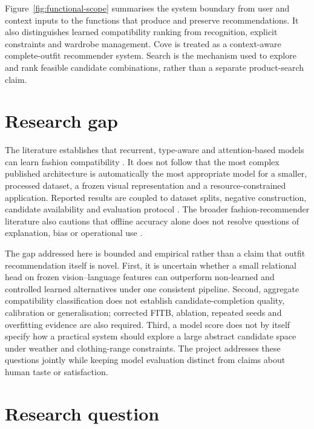 Figure~\ref{fig:functional-scope} summarises the system boundary from user and
context inputs to the functions that produce and preserve recommendations. It
also distinguishes learned compatibility ranking from recognition, explicit
constraints and wardrobe management. Cove is treated as a
context-aware complete-outfit recommender system. Search is the mechanism used
to explore and rank feasible candidate combinations, rather than a separate
product-search claim.



\section{Research gap}

The literature establishes that recurrent, type-aware and attention-based
models can learn fashion compatibility
\parencite{han2017bilstm,vasileva2018typeaware,sarkar2023outfittransformer}.
It does not follow that the most
complex published architecture is automatically the most appropriate model
for a smaller, processed dataset, a frozen visual representation and a
resource-constrained application. Reported results are coupled to dataset
splits, negative construction, candidate availability and evaluation protocol
\parencite{herlocker2004evaluation,vasileva2018typeaware}.
The broader fashion-recommender literature also cautions that offline accuracy
alone does not resolve questions of explanation, bias or operational use
\parencite{deldjoo2023review}.

The gap addressed here is bounded and empirical rather than a claim
that outfit recommendation itself is novel. First, it is uncertain whether a
small relational head on frozen vision--language features can outperform
non-learned and controlled learned alternatives under one consistent
pipeline. Second, aggregate compatibility classification does not establish
candidate-completion quality, calibration or generalisation; corrected FITB,
ablation, repeated seeds and overfitting evidence are also required. Third, a
model score does not by itself specify how a practical system should explore a
large abstract candidate space under weather and clothing-range constraints.
The project addresses these questions jointly while keeping model evaluation
distinct from claims about human taste or satisfaction.

\section{Research question}

